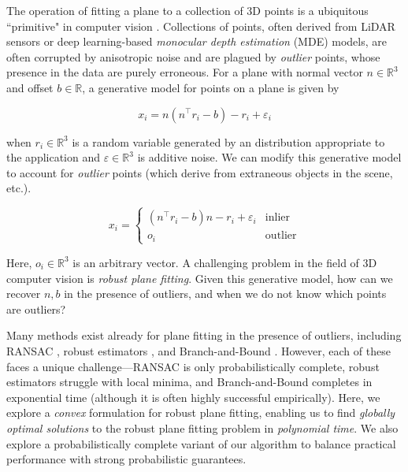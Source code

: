 \documentclass[conference]{IEEEtran}
\begin{document}
The operation of fitting a plane to a collection of 3D points is a ubiquitous ``primitive" in computer vision \cite{gradients}.  Collections of points, often derived from LiDAR sensors or deep learning-based \textit{monocular depth estimation} (MDE) models, are often corrupted by anisotropic noise and are plagued by \textit{outlier} points, whose presence in the data are purely erroneous.  For a plane with normal vector \( n \in \mathbb{R}^3 \) and offset \( b \in \mathbb{R} \), a generative model for points on a plane is given by

\begin{equation}
	x_i = n(n^\top r_i - b) - r_i + \varepsilon_i
\end{equation}

when \( r_i \in \mathbb{R}^3 \) is a random variable generated by an distribution appropriate to the application and \( \varepsilon \in \mathbb{R}^3 \) is additive noise.  We can modify this generative model to account for \textit{outlier} points (which derive from extraneous objects in the scene, etc.).

\begin{equation}
	x_i = \begin{cases}
		(n^\top r_i - b)n - r_i + \varepsilon_i & \text{inlier} \\
		o_i & \text{outlier}
	\end{cases}
\end{equation}

Here, \( o_i \in \mathbb{R}^3 \) is an arbitrary vector.  A challenging problem in the field of 3D computer vision is \textit{robust plane fitting}.  Given this generative model, how can we recover \( n, b \) in the presence of outliers, and when we do not know which points are outliers?

Many methods exist already for plane fitting in the presence of outliers, including RANSAC \cite{ransac}, robust estimators \cite{gradients}, and Branch-and-Bound \cite{bnb}.  However, each of these faces a unique challenge---RANSAC is only probabilistically complete, robust estimators struggle with local minima, and Branch-and-Bound completes in exponential time (although it is often highly successful empirically).  Here, we explore a \textit{convex} formulation for robust plane fitting, enabling us to find \textit{globally optimal solutions} to the robust plane fitting problem in \textit{polynomial time}.  We also explore a probabilistically complete variant of our algorithm to balance practical performance with strong probabilistic guarantees.
\end{document}
